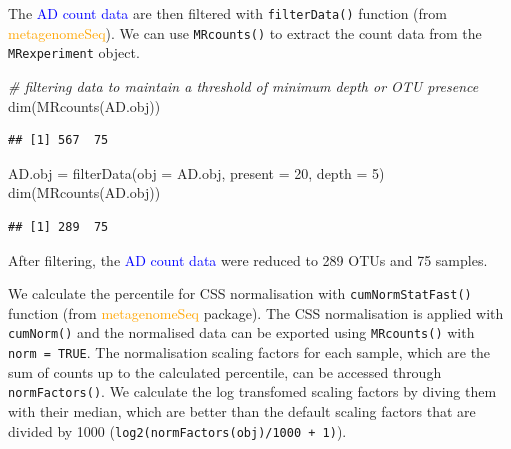 \documentclass[
]{book}
\newenvironment{Shaded}{\begin{snugshade}}{\end{snugshade}}
\newcommand{\AttributeTok}[1]{\textcolor[rgb]{0.77,0.63,0.00}{#1}}
\newcommand{\CommentTok}[1]{\textcolor[rgb]{0.56,0.35,0.01}{\textit{#1}}}
\newcommand{\DecValTok}[1]{\textcolor[rgb]{0.00,0.00,0.81}{#1}}
\newcommand{\FunctionTok}[1]{\textcolor[rgb]{0.00,0.00,0.00}{#1}}
\newcommand{\NormalTok}[1]{#1}
\newcommand{\OtherTok}[1]{\textcolor[rgb]{0.56,0.35,0.01}{#1}}
\begin{document}
The \textcolor{blue}{AD count data} are then filtered with \texttt{filterData()} function (from \textcolor{orange}{metagenomeSeq}). We can use \texttt{MRcounts()} to extract the count data from the \texttt{MRexperiment} object.

\begin{Shaded}
\begin{Highlighting}[]
\CommentTok{\# filtering data to maintain a threshold of minimum depth or OTU presence}
\FunctionTok{dim}\NormalTok{(}\FunctionTok{MRcounts}\NormalTok{(AD.obj))}
\end{Highlighting}
\end{Shaded}

\begin{verbatim}
## [1] 567  75
\end{verbatim}

\begin{Shaded}
\begin{Highlighting}[]
\NormalTok{AD.obj }\OtherTok{=} \FunctionTok{filterData}\NormalTok{(}\AttributeTok{obj =}\NormalTok{ AD.obj, }\AttributeTok{present =} \DecValTok{20}\NormalTok{, }\AttributeTok{depth =} \DecValTok{5}\NormalTok{)}
\FunctionTok{dim}\NormalTok{(}\FunctionTok{MRcounts}\NormalTok{(AD.obj))}
\end{Highlighting}
\end{Shaded}

\begin{verbatim}
## [1] 289  75
\end{verbatim}

After filtering, the \textcolor{blue}{AD count data} were reduced to 289 OTUs and 75 samples.

We calculate the percentile for CSS normalisation with \texttt{cumNormStatFast()} function (from \textcolor{orange}{metagenomeSeq} package). The CSS normalisation is applied with \texttt{cumNorm()} and the normalised data can be exported using \texttt{MRcounts()} with \texttt{norm\ =\ TRUE}. The normalisation scaling factors for each sample, which are the sum of counts up to the calculated percentile, can be accessed through \texttt{normFactors()}. We calculate the log transfomed scaling factors by diving them with their median, which are better than the default scaling factors that are divided by 1000 (\texttt{log2(normFactors(obj)/1000\ +\ 1)}).
\end{document}
